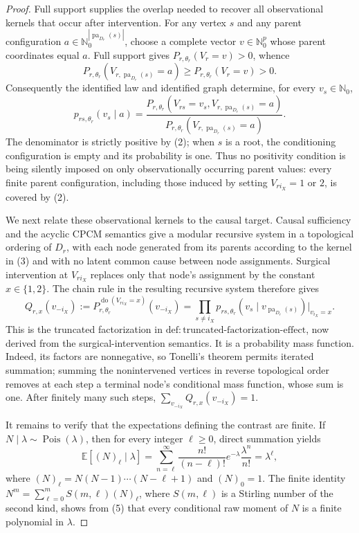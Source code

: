 \documentclass{article}
\begin{document}
\begin{proof}
Full support supplies the overlap needed to recover all observational kernels that occur after intervention.  For any vertex \(s\) and any parent configuration
\(a\in\mathbb N_0^{|\operatorname{pa}_{D_r}(s)|}\), choose a complete vector \(v\in\mathbb N_0^p\) whose parent coordinates equal \(a\).  Full support gives \(P_{r,\theta_r}(V_r=v)>0\), whence
\[
P_{r,\theta_r}\!\left(V_{r,\operatorname{pa}_{D_r}(s)}=a\right)
\geq P_{r,\theta_r}(V_r=v)>0. \tag{2}
\]
Consequently the identified law and identified graph determine, for every \(v_s\in\mathbb N_0\),
\[
p_{rs,\theta_r}(v_s\mid a)
=\frac{P_{r,\theta_r}\!\left(V_{rs}=v_s,
V_{r,\operatorname{pa}_{D_r}(s)}=a\right)}
{P_{r,\theta_r}\!\left(V_{r,\operatorname{pa}_{D_r}(s)}=a\right)}. \tag{3}
\]
The denominator is strictly positive by (2); when \(s\) is a root, the conditioning configuration is empty and its probability is one.  Thus no positivity condition is being silently imposed on only observationally occurring parent values: every finite parent configuration, including those induced by setting \(V_{r i_X}=1\) or \(2\), is covered by (2).

We next relate these observational kernels to the causal target.  Causal sufficiency and the acyclic CPCM semantics give a modular recursive system in a topological ordering of \(D_r\), with each node generated from its parents according to the kernel in (3) and with no latent common cause between node assignments.  Surgical intervention at \(V_{r i_X}\) replaces only that node's assignment by the constant \(x\in\{1,2\}\).  The chain rule in the resulting recursive system therefore gives
\[
Q_{r,x}(v_{-i_X})
:=P_{r,\theta_r}^{\operatorname{do}(V_{r i_X}=x)}(v_{-i_X})
=\prod_{s\ne i_X}
p_{rs,\theta_r}\!\left(v_s\mid
v_{\operatorname{pa}_{D_r}(s)}\right)
\Big|_{v_{i_X}=x}. \tag{4}
\]
This is the truncated factorization in \(\mathrm{def{:}truncated\text{-}factorization\text{-}effect}\), now derived from the surgical-intervention semantics.  It is a probability mass function.  Indeed, its factors are nonnegative, so Tonelli's theorem permits iterated summation; summing the nonintervened vertices in reverse topological order removes at each step a terminal node's conditional mass function, whose sum is one.  After finitely many such steps, \(\sum_{v_{-i_X}}Q_{r,x}(v_{-i_X})=1\).

It remains to verify that the expectations defining the contrast are finite.  If \(N\mid\lambda\sim\operatorname{Pois}(\lambda)\), then for every integer \(\ell\geq0\), direct summation yields
\[
\mathbb E[(N)_{\ell}\mid\lambda]
=\sum_{n=\ell}^{\infty}
\frac{n!}{(n-\ell)!}e^{-\lambda}\frac{\lambda^n}{n!}
=\lambda^{\ell}, \tag{5}
\]
where \((N)_{\ell}=N(N-1)\cdots(N-\ell+1)\) and \((N)_0=1\).  The finite identity
\(N^m=\sum_{\ell=0}^{m}S(m,\ell)(N)_{\ell}\), where \(S(m,\ell)\) is a Stirling number of the second kind, shows from (5) that every conditional raw moment of \(N\) is a finite polynomial in \(\lambda\).


\end{proof}
\end{document}
